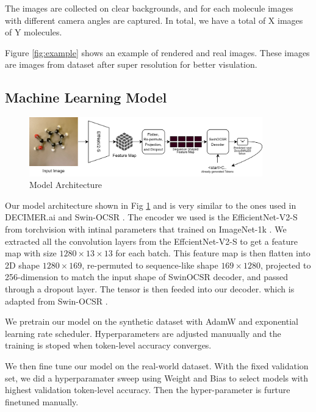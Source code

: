 \documentclass{article}
\begin{document}
The images are collected on clear backgrounds, and for each molecule images with different camera angles are captured. In total, we have a total of X images of Y molecules.  

Figure \ref{fig:example} shows an example of rendered and real images. These images are images from dataset after super resolution for better visulation. 
\subsection{Machine Learning Model} 
\begin{figure}
    \centering
    \includegraphics[width=0.9\textwidth]{arch}
    \caption{Model Architecture}
    \label{fig:arch}
\end{figure}
Our model architecture shown in Fig \ref{fig:arch} and  is very similar to the ones used in DECIMER.ai \autocite{decimer} and Swin-OCSR \autocite{swinocsr}. The encoder we used is the EfficientNet-V2-S \autocite{effv2} from torchvision \autocite{torchvision2016} with intinal parameters that trained on ImageNet-1k \autocite{imagenet}. We extracted all the convolution layers from the EffcientNet-V2-S to get a feature map with size $1280\times13\times13$  for each batch. This feature map is then flatten into 2D shape $1280\times169$, re-permuted to sequence-like shape $169\times1280$, projected to 256-dimension to match the input shape of SwinOCSR decoder, and passed through a dropout layer. The tensor is then feeded into our decoder. which is adapted from Swin-OCSR \autocite{swinocsr}. 


We pretrain our model on the synthetic dataset with AdamW \cite{adamw} and exponential learning rate scheduler. Hyperparameters are adjusted manuually and the training is stoped when token-level accuracy converges. 

We then fine tune our model on the real-world dataset. With the fixed validation set, we did a hyperparamater sweep using Weight and Bias \autocite{wandb} to select models with highest validation token-level accuracy. Then the hyper-parameter is furture finetuned manually. 
\end{document}
